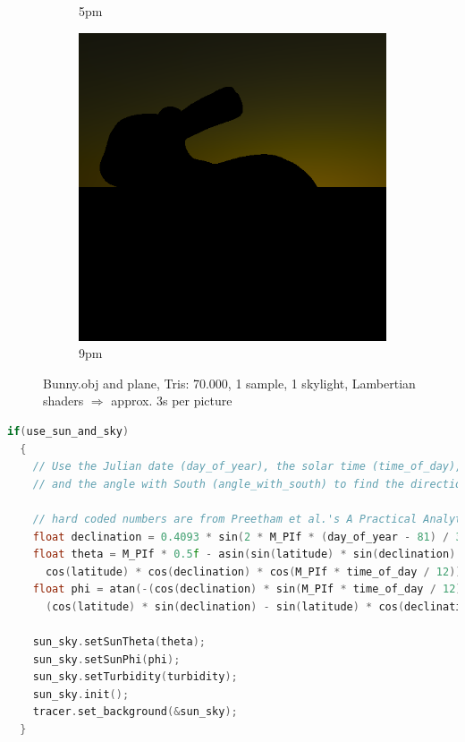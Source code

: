 \begin{figure}[h]
\begin{subfigure}[b]{0.3\textwidth}
		\caption{5pm}
		\label{fig:skylight17}
	\end{subfigure}
	\begin{subfigure}[b]{0.3\textwidth}
		\includegraphics[width=\textwidth]{week2/2/bunny_19.png}
		\caption{9pm}
		\label{fig:skylight19}
	\end{subfigure}
	\caption{Bunny.obj and plane, Tris: 70.000, 1 sample, 1 skylight, Lambertian shaders $\Rightarrow$ approx. 3s per picture}
	\label{fig:sunlight}
\end{figure}

\newpage
\begin{lstlisting}[language=C++,caption=RenderEngine::init\_tracer(),label=lst:renderengine::init_tracer,firstnumber=240]
if(use_sun_and_sky)
  {
    // Use the Julian date (day_of_year), the solar time (time_of_day), the latitude (latitude),
    // and the angle with South (angle_with_south) to find the direction toward the sun (sun_dir).

    // hard coded numbers are from Preetham et al.'s A Practical Analytical Model for Daylight, SIGGRAPH 1999
    float declination = 0.4093 * sin(2 * M_PIf * (day_of_year - 81) / 368);
    float theta = M_PIf * 0.5f - asin(sin(latitude) * sin(declination) - 
      cos(latitude) * cos(declination) * cos(M_PIf * time_of_day / 12));
    float phi = atan(-(cos(declination) * sin(M_PIf * time_of_day / 12)) / 
      (cos(latitude) * sin(declination) - sin(latitude) * cos(declination) * cos(M_PIf * time_of_day / 12)));

    sun_sky.setSunTheta(theta);
    sun_sky.setSunPhi(phi);
    sun_sky.setTurbidity(turbidity);
    sun_sky.init();
    tracer.set_background(&sun_sky);
  }
\end{lstlisting}

